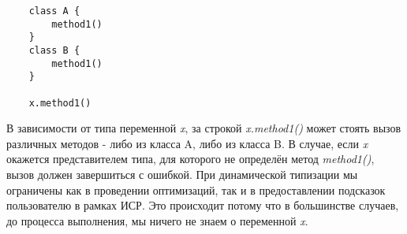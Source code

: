 \vskip4pt

\begin{verbatim}
    class A {
        method1()
    }
    class B {
        method1()
    }

    x.method1()
\end{verbatim} 

\vskip4pt


В зависимости от типа переменной \textit{x}, за строкой \textit{x.method1()} может стоять вызов различных методов - либо из класса A, либо из класса B. В случае, если \textit{x} окажется представителем типа, для которого не определён метод \textit{method1()}, вызов должен завершиться с ошибкой. При динамической типизации мы ограничены как в проведении оптимизаций, так и в предоставлении подсказок пользователю в рамках ИСР. Это происходит потому что в большинстве случаев, до процесса выполнения, мы ничего не знаем о переменной \textit{x}.


